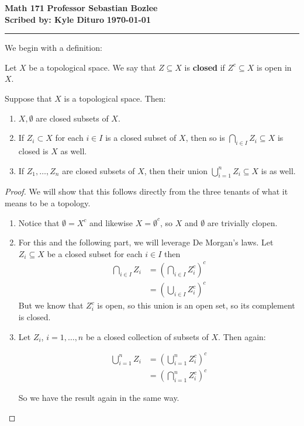 \documentclass[12pt, twosided]{article}
\begin{document}
\noindent \textbf{Math 171} \hfill \textbf{Professor Sebastian Bozlee} \\
\textbf{Scribed by: Kyle Dituro} \hfill \textbf{\today}\hrule
\vspace{.2in}

We begin with a definition:

\begin{df}
  Let \(X\) be a topological space. We say that \(Z \subseteq X\) is \textbf{closed} if \(Z^c \subseteq X\) is open in \(X\).
\end{df}

\begin{prop}
  Suppose that \(X\) is a topological space. Then:
  \begin{enumerate}
  \item \(X, \emptyset\) are closed subsets of \(X\).
  \item If \(Z_i \subset X\) for each \(i \in I\) is a closed subset of \(X\), then so is \(\bigcap_{i \in I}Z_i \subseteq X\) is closed is \(X\) as well.
  \item If \(Z_1, \ldots, Z_n\) are closed subsets of \(X\), then their union \(\bigcup_{i = 1}^nZ_i \subseteq X\) is as well.
  \end{enumerate}
\end{prop}
\begin{proof}
  We will show that this follows directly from the three tenants of what it means to be a topology.
  \begin{enumerate}
  \item Notice that \(\emptyset = X^c\) and likewise \(X = \emptyset^c\), so \(X\) and \(\emptyset\) are trivially clopen.
  \item For this and the following part, we will leverage De Morgan's laws. Let \(Z_i \subseteq X\) be a closed subset for each \(i \in I\) then
    \begin{align*}
      \bigcap_{i\in I}Z_i &= \left(\bigcap_{i \in I}Z_i^c\right)^c \\
                          &= \left(\bigcup_{i \in I} Z_{i}^c \right)^c
    \end{align*}
    But we know that \(Z_i^c\) is open, so this union is an open set, so its complement is closed.
  \item Let \(Z_i\), \(i = 1, \ldots, n\) be a closed collection of subsets of \(X\). Then again:

    \begin{align*}
      \bigcup_{i=1}^n Z_{i} &= \left(\bigcup_{i=1}^nZ_i^c\right)^c \\
                            &=\left(\bigcap_{i=1}^nZ_i^c \right)^c
    \end{align*}

    So we have the result again in the same way.
  \end{enumerate}
\end{proof}
\end{document}
